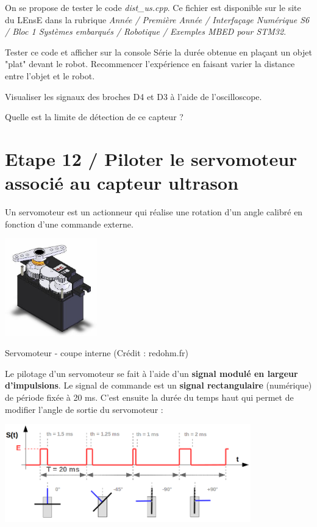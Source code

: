 \documentclass[a4paper,11pt,titlepage]{article} %
\begin{document}
On se propose de tester le code \textsl{dist\_us.cpp}. Ce fichier est disponible sur le site du LEnsE dans la rubrique \textit{Année / Première Année / Interfaçage Numérique S6 / Bloc 1 Systèmes embarqués / Robotique / Exemples MBED pour STM32}.

\Manip Tester ce code et afficher sur la console Série la durée obtenue en  plaçant un objet "plat" devant le robot. Recommencer l'expérience en faisant varier la distance entre l'objet et le robot.

\Manip Visualiser les signaux des broches D4 et D3 à l'aide de l'oscilloscope.

\Quest Quelle est la limite de détection de ce capteur ?

\newpage
\section{Etape 12 / Piloter le servomoteur associé au capteur ultrason}

Un servomoteur est un actionneur qui réalise une rotation d'un angle calibré en fonction d'une commande externe.

\begin{center}
	\includegraphics[width=0.3\textwidth]{images/MINE_Nucleo_servomoteur-redohm.jpg}
	
	Servomoteur - coupe interne (Crédit : redohm.fr)
\end{center}

Le pilotage d'un servomoteur se fait à l'aide d'un \textbf{signal modulé en largeur d'impulsions}. Le signal de commande est un \textbf{signal rectangulaire} (numérique) de période fixée à 20 ms. C'est ensuite la durée du temps haut qui permet de modifier l'angle de sortie du servomoteur :

\begin{center}
	\includegraphics[width=0.8\textwidth]{images/MINE_Nucleo_servomoteur.png}
\end{center}
\end{document}
